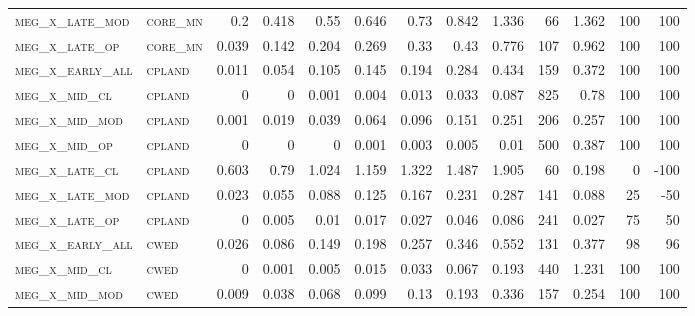 \begin{landscape}
\begin{center}
\begin{footnotesize}
\begin{longtable}{llrrrrrrrr|rrr}
\textsc{meg\_x\_late\_mod } & \textsc{core\_mn  }   & 0.2      & 0.418    & 0.55     & 0.646    & 0.73     & 0.842    & 1.336     & 66     & 1.362         & 100           & 100             \\
\textsc{meg\_x\_late\_op  } & \textsc{core\_mn  }   & 0.039    & 0.142    & 0.204    & 0.269    & 0.33     & 0.43     & 0.776     & 107    & 0.962         & 100           & 100             \\
\textsc{meg\_x\_early\_all} & \textsc{cpland    }   & 0.011    & 0.054    & 0.105    & 0.145    & 0.194    & 0.284    & 0.434     & 159    & 0.372         & 100           & 100             \\
\textsc{meg\_x\_mid\_cl   } & \textsc{cpland    }   & 0        & 0        & 0.001    & 0.004    & 0.013    & 0.033    & 0.087     & 825    & 0.78          & 100           & 100             \\
\textsc{meg\_x\_mid\_mod  } & \textsc{cpland    }   & 0.001    & 0.019    & 0.039    & 0.064    & 0.096    & 0.151    & 0.251     & 206    & 0.257         & 100           & 100             \\
\textsc{meg\_x\_mid\_op   } & \textsc{cpland    }   & 0        & 0        & 0        & 0.001    & 0.003    & 0.005    & 0.01      & 500    & 0.387         & 100           & 100             \\
\textsc{meg\_x\_late\_cl  } & \textsc{cpland    }   & 0.603    & 0.79     & 1.024    & 1.159    & 1.322    & 1.487    & 1.905     & 60     & 0.198         & 0             & -100            \\
\textsc{meg\_x\_late\_mod } & \textsc{cpland    }   & 0.023    & 0.055    & 0.088    & 0.125    & 0.167    & 0.231    & 0.287     & 141    & 0.088         & 25            & -50             \\
\textsc{meg\_x\_late\_op  } & \textsc{cpland    }   & 0        & 0.005    & 0.01     & 0.017    & 0.027    & 0.046    & 0.086     & 241    & 0.027         & 75            & 50              \\
\textsc{meg\_x\_early\_all} & \textsc{cwed      }   & 0.026    & 0.086    & 0.149    & 0.198    & 0.257    & 0.346    & 0.552     & 131    & 0.377         & 98            & 96              \\
\textsc{meg\_x\_mid\_cl   } & \textsc{cwed      }   & 0        & 0.001    & 0.005    & 0.015    & 0.033    & 0.067    & 0.193     & 440    & 1.231         & 100           & 100             \\
\textsc{meg\_x\_mid\_mod  } & \textsc{cwed      }   & 0.009    & 0.038    & 0.068    & 0.099    & 0.13     & 0.193    & 0.336     & 157    & 0.254         & 100           & 100             \\

\end{longtable}
\end{footnotesize}
\end{center}
\end{landscape}

